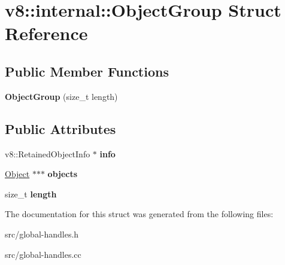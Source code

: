 \hypertarget{structv8_1_1internal_1_1_object_group}{}\section{v8\+:\+:internal\+:\+:Object\+Group Struct Reference}
\label{structv8_1_1internal_1_1_object_group}
\subsection*{Public Member Functions}
\begin{DoxyCompactItemize}
\item 
\hypertarget{structv8_1_1internal_1_1_object_group_a4bb040142bb977b125b3022aed3a21ba}{}{\bfseries Object\+Group} (size\+\_\+t length)\label{structv8_1_1internal_1_1_object_group_a4bb040142bb977b125b3022aed3a21ba}

\end{DoxyCompactItemize}
\subsection*{Public Attributes}
\begin{DoxyCompactItemize}
\item 
\hypertarget{structv8_1_1internal_1_1_object_group_a6bb7e53963ec8ea1bbd1b0e08521076c}{}v8\+::\+Retained\+Object\+Info $\ast$ {\bfseries info}\label{structv8_1_1internal_1_1_object_group_a6bb7e53963ec8ea1bbd1b0e08521076c}

\item 
\hypertarget{structv8_1_1internal_1_1_object_group_ad6b1302b2c725967f6ad435497d1bb35}{}\hyperlink{classv8_1_1internal_1_1_object}{Object} $\ast$$\ast$$\ast$ {\bfseries objects}\label{structv8_1_1internal_1_1_object_group_ad6b1302b2c725967f6ad435497d1bb35}

\item 
\hypertarget{structv8_1_1internal_1_1_object_group_a39f75e31d8f5d86bd48536bfb197f1cc}{}size\+\_\+t {\bfseries length}\label{structv8_1_1internal_1_1_object_group_a39f75e31d8f5d86bd48536bfb197f1cc}

\end{DoxyCompactItemize}


The documentation for this struct was generated from the following files\+:\begin{DoxyCompactItemize}
\item 
src/global-\/handles.\+h\item 
src/global-\/handles.\+cc\end{DoxyCompactItemize}
